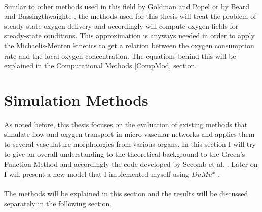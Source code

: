 \\Similar to other methods used in this field by Goldman and Popel \cite{goldman2001computational} or by Beard and Bassingthwaighte \cite{beard2001modeling}, the methods used for this thesis will treat the problem of steady-state oxygen delivery and accordingly will compute oxygen fields for steady-state conditions. This approximation is anyways needed in order to apply the Michaelis-Menten kinetics to get a relation between the oxygen consumption rate and the local oxygen concentration. The equations behind this will be explained in the Computational Methods \ref{CompMod} section.




\newpage
\section{Simulation Methods}

As noted before, this thesis focuses on the evaluation of existing
methods that simulate flow and oxygen transport in micro-vascular networks
and applies them to several vasculature morphologies from various organs. In this section I will try to give an overall understanding to the theoretical background to the Green's Function Method and accordingly the code developed by Secomb et al. \cite{Secomb2004}. Later on I will present a new model that I implemented myself using $DuMu^x$ \cite{flemisch2007dumux}.\\
\\The methods will be explained in this section and the results will be discussed separately in the following section.

